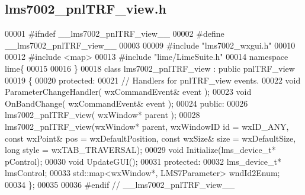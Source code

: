 \subsection{lms7002\+\_\+pnl\+T\+R\+F\+\_\+view.\+h}
\label{lms7002__pnlTRF__view_8h_source}

\begin{DoxyCode}
00001 \textcolor{preprocessor}{#ifndef \_\_lms7002\_pnlTRF\_view\_\_}
00002 \textcolor{preprocessor}{#define \_\_lms7002\_pnlTRF\_view\_\_}
00003 
00009 \textcolor{preprocessor}{#include "lms7002_wxgui.h"}
00010 
00012 \textcolor{preprocessor}{#include <map>}
00013 \textcolor{preprocessor}{#include "lime/LimeSuite.h"}
00014 \textcolor{keyword}{namespace }lime\{
00015 
00016 \}
00018 \textcolor{keyword}{class }lms7002_pnlTRF_view : \textcolor{keyword}{public} pnlTRF_view
00019 \{
00020     \textcolor{keyword}{protected}:
00021         \textcolor{comment}{// Handlers for pnlTRF\_view events.}
00022         \textcolor{keywordtype}{void} ParameterChangeHandler( wxCommandEvent& event );
00023         \textcolor{keywordtype}{void} OnBandChange( wxCommandEvent& event );
00024     \textcolor{keyword}{public}:
00026         lms7002_pnlTRF_view( wxWindow* parent );
00028     lms7002_pnlTRF_view(wxWindow* parent, wxWindowID \textcolor{keywordtype}{id} = wxID\_ANY, \textcolor{keyword}{const} wxPoint& pos = wxDefaultPosition,
       \textcolor{keyword}{const} wxSize& size = wxDefaultSize, \textcolor{keywordtype}{long} style = wxTAB\_TRAVERSAL);
00029     \textcolor{keywordtype}{void} Initialize(lms_device_t* pControl);
00030     \textcolor{keywordtype}{void} UpdateGUI();
00031 \textcolor{keyword}{protected}:
00032     lms_device_t* lmsControl;
00033     std::map<wxWindow*, LMS7Parameter> wndId2Enum;
00034 \};
00035 
00036 \textcolor{preprocessor}{#endif // \_\_lms7002\_pnlTRF\_view\_\_}
\end{DoxyCode}
